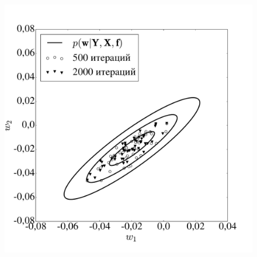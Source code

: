 \begin{figure}[tbh!]
  \includegraphics[width=\linewidth]{./plots/var/lang.pdf}
\endminipage\hfill
  \caption{}
\label{fig:var}
\end{figure}

